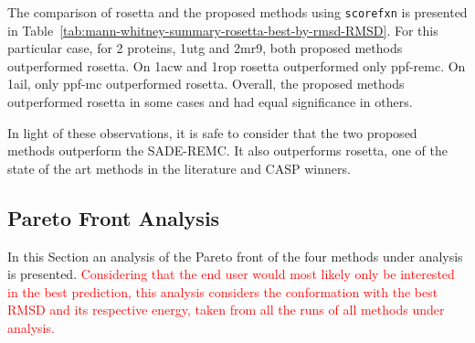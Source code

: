 The comparison of rosetta and the proposed methods using \texttt{scorefxn}
is presented in Table~\ref{tab:mann-whitney-summary-rosetta-best-by-rmsd-RMSD}.
For this particular case, for 2 proteins, 1utg and 2mr9, both proposed
methods outperformed rosetta. On 1acw and 1rop rosetta outperformed only
ppf-remc. On 1ail, only ppf-mc outperformed rosetta. Overall,
the proposed methods outperformed rosetta in some cases and had equal
significance in others.

In light of these observations, it is safe to consider that the two proposed
methods outperform the SADE-REMC. It also outperforms rosetta, one of
the state of the art methods in the literature and CASP winners.

\subsection{Pareto Front Analysis}\label{sec:pareto-front-analysis}

In this Section an analysis of the Pareto front of the four methods under
analysis is presented.
\textcolor{red}{
Considering that the end user would most likely only be
interested in the best prediction, this analysis considers the conformation with
the best RMSD and its respective energy, taken from all the runs of all methods under
analysis.
}

